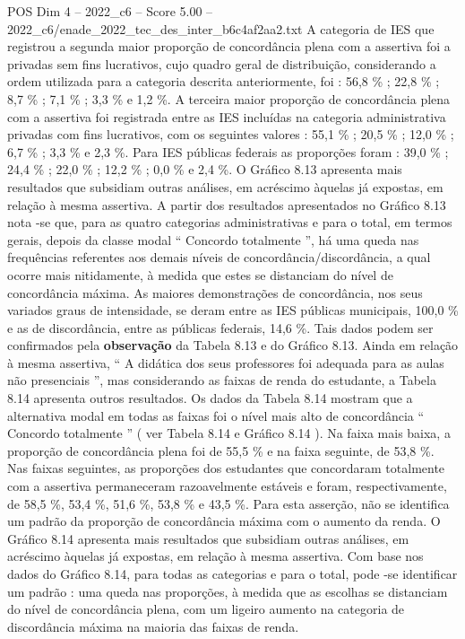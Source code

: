\begin{textsample}{POS Dim 4 – 2022\_c6 – Score 5.00 – 2022\_c6/enade\_2022\_tec\_des\_inter\_b6c4af2aa2.txt}
A categoria de IES que registrou a segunda maior proporção de concordância plena com a assertiva foi a privadas sem fins lucrativos, cujo quadro geral de distribuição, considerando a ordem utilizada para a categoria descrita anteriormente, foi : 56,8 \% ; 22,8 \% ; 8,7 \% ; 7,1 \% ; 3,3 \% e 1,2 \%.
A terceira maior proporção de concordância plena com a assertiva foi registrada entre as IES incluídas na categoria administrativa privadas com fins lucrativos, com os seguintes valores : 55,1 \% ; 20,5 \% ; 12,0 \% ; 6,7 \% ; 3,3 \% e 2,3 \%.
Para IES públicas federais as proporções foram : 39,0 \% ; 24,4 \% ; 22,0 \% ; 12,2 \% ; 0,0 \% e 2,4 \%.
O Gráfico 8.13 apresenta mais resultados que subsidiam outras análises, em acréscimo àquelas já expostas, em relação à mesma assertiva.
A partir dos resultados apresentados no Gráfico 8.13 nota -se que, para as quatro categorias administrativas e para o total, em termos gerais, depois da classe modal “ Concordo totalmente ”, há uma queda nas frequências referentes aos demais níveis de concordância/discordância, a qual ocorre mais nitidamente, à medida que estes se distanciam do nível de concordância máxima.
As maiores demonstrações de concordância, nos seus variados graus de intensidade, se deram entre as IES públicas municipais, 100,0 \% e as de discordância, entre as públicas federais, 14,6 \%.
Tais dados podem ser confirmados pela \textbf{observação} da Tabela 8.13 e do Gráfico 8.13.
Ainda em relação à mesma assertiva, “ A didática dos seus professores foi adequada para as aulas não presenciais ”, mas considerando as faixas de renda do estudante, a Tabela 8.14 apresenta outros resultados.
Os dados da Tabela 8.14 mostram que a alternativa modal em todas as faixas foi o nível mais alto de concordância “ Concordo totalmente ” ( ver Tabela 8.14 e Gráfico 8.14 ).
Na faixa mais baixa, a proporção de concordância plena foi de 55,5 \% e na faixa seguinte, de 53,8 \%.
Nas faixas seguintes, as proporções dos estudantes que concordaram totalmente com a assertiva permaneceram razoavelmente estáveis e foram, respectivamente, de 58,5 \%, 53,4 \%, 51,6 \%, 53,8 \% e 43,5 \%.
Para esta asserção, não se identifica um padrão da proporção de concordância máxima com o aumento da renda.
O Gráfico 8.14 apresenta mais resultados que subsidiam outras análises, em acréscimo àquelas já expostas, em relação à mesma assertiva.
Com base nos dados do Gráfico 8.14, para todas as categorias e para o total, pode -se identificar um padrão : uma queda nas proporções, à medida que as escolhas se distanciam do nível de concordância plena, com um ligeiro aumento na categoria de discordância máxima na maioria das faixas de renda.

\end{textsample}
